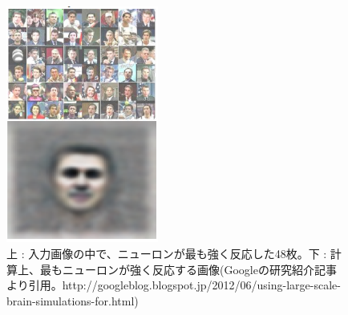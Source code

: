 \begin{figure}[tbp]
 \begin{center}
  \includegraphics[width=50mm]{img/c1/google_face}
 \end{center}
 \caption{上 : 入力画像の中で、ニューロンが最も強く反応した48枚。下 : 計算上、最もニューロンが強く反応する画像\newline  (Googleの研究紹介記事より引用。http://googleblog.blogspot.jp/2012/06/using-large-scale-brain-simulations-for.html)}%
 
 \label{c1_facedetection}
\end{figure}


